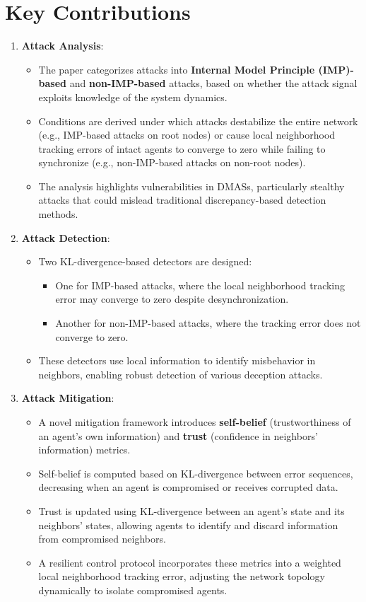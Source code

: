 \documentclass{article}
\begin{document}
\section*{Key Contributions}
\begin{enumerate}
    \item \textbf{Attack Analysis}:
    \begin{itemize}
        \item The paper categorizes attacks into \textbf{Internal Model Principle (IMP)-based} and \textbf{non-IMP-based} attacks, based on whether the attack signal exploits knowledge of the system dynamics.
        \item Conditions are derived under which attacks destabilize the entire network (e.g., IMP-based attacks on root nodes) or cause local neighborhood tracking errors of intact agents to converge to zero while failing to synchronize (e.g., non-IMP-based attacks on non-root nodes).
        \item The analysis highlights vulnerabilities in DMASs, particularly stealthy attacks that could mislead traditional discrepancy-based detection methods.
    \end{itemize}

    \item \textbf{Attack Detection}:
    \begin{itemize}
        \item Two KL-divergence-based detectors are designed:
        \begin{itemize}
            \item One for IMP-based attacks, where the local neighborhood tracking error may converge to zero despite desynchronization.
            \item Another for non-IMP-based attacks, where the tracking error does not converge to zero.
        \end{itemize}
        \item These detectors use local information to identify misbehavior in neighbors, enabling robust detection of various deception attacks.
    \end{itemize}

    \item \textbf{Attack Mitigation}:
    \begin{itemize}
        \item A novel mitigation framework introduces \textbf{self-belief} (trustworthiness of an agent’s own information) and \textbf{trust} (confidence in neighbors’ information) metrics.
        \item Self-belief is computed based on KL-divergence between error sequences, decreasing when an agent is compromised or receives corrupted data.
        \item Trust is updated using KL-divergence between an agent’s state and its neighbors’ states, allowing agents to identify and discard information from compromised neighbors.
        \item A resilient control protocol incorporates these metrics into a weighted local neighborhood tracking error, adjusting the network topology dynamically to isolate compromised agents.
    \end{itemize}


\end{enumerate}
\end{document}
